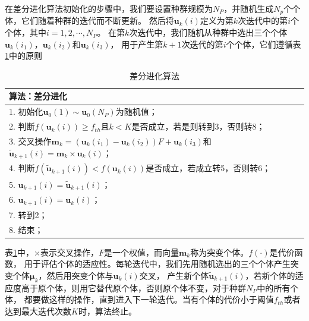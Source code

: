 \documentclass[master]{thesis-uestc}
\begin{document}
在差分进化算法初始化的步骤中，我们要设置种群规模为$N_P$，并随机生成$N_p$个个体，它们随着种群的迭代而不断更新。
然后将$\bm{u}_k(i)$定义为第$k$次迭代中的第$i$个个体，其中$i=1,2,\cdots,N_P$。
在第$k$次迭代中，我们随机从种群中选出三个个体$\bm{u}_k(i_1)$，$\bm{u}_k(i_2)$和$\bm{u}_k(i_3)$，
用于产生第$k+1$次迭代的第$i$个个体，它们遵循表\ref{de_algorithm_tab}中的原则
\begin{table}[h]
    \caption{差分进化算法}
    \begin{tabular}{l}
    \toprule
    算法：差分进化\\
    \midrule
    1. 初始化$\bm{u}_0(1)\sim\bm{u}_0(N_P)$为随机值；\\
    2. 判断$f(\bm{u}_k(i))\geqslant f_{th}$且$k<K$是否成立，若是则转到3，否则转8； \\
    3. 交叉操作$\bm{m}_k = \left(\bm{u}_k(i_1)-\bm{u}_k(i_2)\right)F + \bm{u}_k(i_3)$和
        $\tilde{\bm{u}}_{k+1}(i) = \bm{m}_k \times \bm{u}_k(i)$； \\
    4. 判断$f(\tilde{\bm{u}}_{k+1}(i)) < f(\bm{u}_k(i))$是否成立，若成立转5，否则转6； \\
    5. $\bm{u}_{k+1}(i) = \tilde{\bm{u}}_{k+1}(i)$； \\
    6. $\bm{u}_{k+1}(i) = \bm{u}_{k}(i)$； \\
    7. 转到2； \\
    8. 结束； \\
    \bottomrule
    \end{tabular}
    \label{de_algorithm_tab}
\end{table}

表\ref{de_algorithm_tab}中，$\times$表示交叉操作，$F$是一个权值，而向量$\bm{m}_k$称为突变个体。$f(\cdot)$是代价函数，
用于评估个体的适应性。每轮迭代中，我们先用随机选出的三个个体产生突变个体$\bm{\mu}_k$，然后用突变个体与$\bm{u}_k(i)$交叉，
产生新个体$\tilde{\bm{u}}_{k+1}(i)$，若新个体的适应度高于原个体，则用它替代原个体，否则原个体不变，对于种群$N_P$中的所有个体，
都要做这样的操作，直到进入下一轮迭代。当有个体的代价小于阈值$f_{th}$或者达到最大迭代次数$K$时，算法终止。
\end{document}
